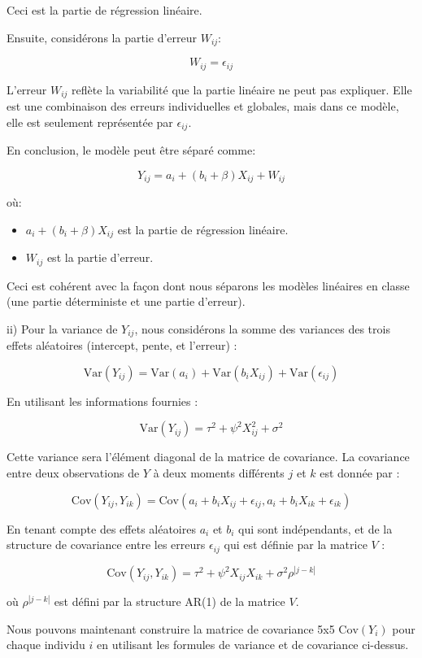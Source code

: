 \documentclass{article}
\begin{document}
Ceci est la partie de régression linéaire.

Ensuite, considérons la partie d'erreur \(W_{ij}\):

\[
W_{ij} = \epsilon_{ij}
\]

L'erreur \(W_{ij}\) reflète la variabilité que la partie linéaire ne peut pas expliquer. Elle est une combinaison des erreurs individuelles et globales, mais dans ce modèle, elle est seulement représentée par \(\epsilon_{ij}\).

En conclusion, le modèle peut être séparé comme:

\[
Y_{ij} = a_i + (b_i + \beta) X_{ij} + W_{ij}
\]

où:
\begin{itemize}
    \item \(a_i + (b_i + \beta) X_{ij}\) est la partie de régression linéaire.
    \item \(W_{ij}\) est la partie d'erreur.
\end{itemize}

Ceci est cohérent avec la façon dont nous séparons les modèles linéaires en classe (une partie déterministe et une partie d'erreur).

ii) Pour la variance de \( Y_{ij} \), nous considérons la somme des variances des trois effets aléatoires (intercept, pente, et l'erreur) :

\begin{equation}
\text{Var}(Y_{ij}) = \text{Var}(a_i) + \text{Var}(b_i X_{ij}) + \text{Var}(\epsilon_{ij})
\end{equation}

En utilisant les informations fournies :

\begin{equation}
\text{Var}(Y_{ij}) = \tau^2 + \psi^2 X_{ij}^2 + \sigma^2
\end{equation}

Cette variance sera l'élément diagonal de la matrice de covariance.
La covariance entre deux observations de \( Y \) à deux moments différents \( j \) et \( k \) est donnée par :

\begin{equation}
\text{Cov}(Y_{ij}, Y_{ik}) = \text{Cov}(a_i + b_i X_{ij} + \epsilon_{ij}, a_i + b_i X_{ik} + \epsilon_{ik})
\end{equation}

En tenant compte des effets aléatoires \( a_i \) et \( b_i \) qui sont indépendants, et de la structure de covariance entre les erreurs \( \epsilon_{ij} \) qui est définie par la matrice \( V \) :

\begin{equation}
\text{Cov}(Y_{ij}, Y_{ik}) = \tau^2 + \psi^2 X_{ij} X_{ik} + \sigma^2 \rho^{|j-k|}
\end{equation}

où \( \rho^{|j-k|} \) est défini par la structure AR(1) de la matrice \( V \).

Nous pouvons maintenant construire la matrice de covariance 5x5 \( \text{Cov}(Y_i) \) pour chaque individu \( i \) en utilisant les formules de variance et de covariance ci-dessus.
\end{document}
